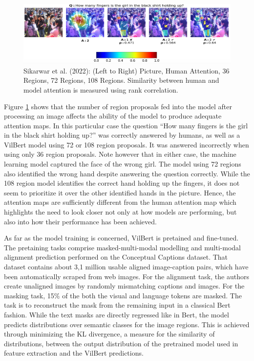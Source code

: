 \documentclass[
]{krantz}
\begin{document}
\begin{figure}

{\centering \includegraphics[width=1\linewidth]{figures/05-chapter2/vilbertmaps} 

}

\caption{Sikarwar et al. (2022): (Left to Right) Picture, Human Attention, 36 Regions, 72 Regions, 108 Regions. Similarity between human and model attention is measured using rank correlation.}\label{fig:vilbertmaps}
\end{figure}

Figure \ref{fig:vilbertmaps} shows that the number of region proposals fed into the model after processing an image affects the ability of the model to produce adequate attention maps. In this particular case the question ``How many fingers is the girl in the black shirt holding up?'' was correctly answered by humans, as well as a VilBert model using 72 or 108 region proposals. It was answered incorrectly when using only 36 region proposals. Note however that in either case, the machine learning model captured the face of the wrong girl. The model using 72 regions also identified the wrong hand despite answering the question correctly. While the 108 region model identifies the correct hand holding up the fingers, it does not seem to prioritize it over the other identified hands in the picture. Hence, the attention maps are sufficiently different from the human attention map which highlights the need to look closer not only at how models are performing, but also into how their performance has been achieved.

As far as the model training is concerned, VilBert is pretained and fine-tuned. The pretaining tasks comprise masked-multi-modal modelling and multi-modal alignment prediction performed on the Conceptual Captions dataset. That dataset contains about 3,1 million usable aligned image-caption pairs, which have been automatically scraped from web images. For the alignment task, the authors create unaligned images by randomly mismatching captions and images. For the masking task, 15\% of the both the visual and language tokens are masked. The task is to reconstruct the mask from the remaining input in a classical Bert fashion. While the text masks are directly regressed like in Bert, the model predicts distributions over semantic classes for the image regions.
This is achieved through minimizing the KL divergence, a measure for the similarity of distributions, between the output distribution of the pretrained model used in feature extraction and the VilBert predictions.
\end{document}
